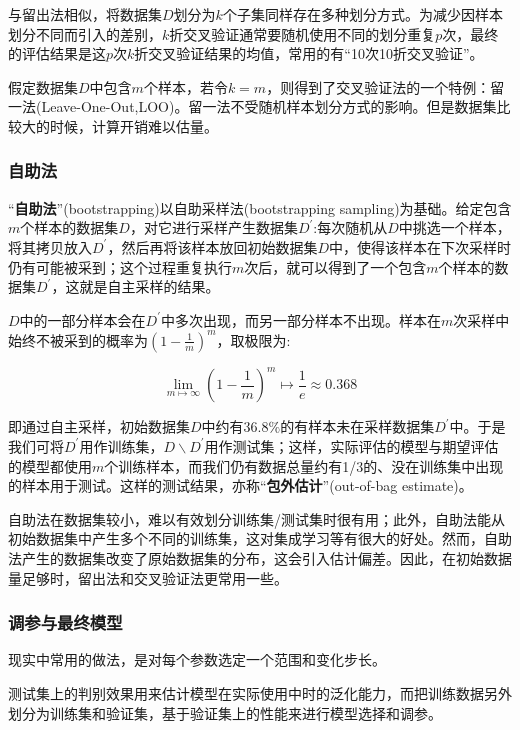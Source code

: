\documentclass[cn,hazy,black,normal]{elegantnote}
\numberwithin{equation}{section}
\numberwithin{figure}{section}
\begin{document}
				与留出法相似，将数据集$D$划分为$k$个子集同样存在多种划分方式。为减少因样本划分不同而引入的差别，$k$折交叉验证通常要随机使用不同的划分重复$p$次，最终的评估结果是这$p$次$k$折交叉验证结果的均值，常用的有“10次10折交叉验证”。
	
				假定数据集$D$中包含$m$个样本，若令$k=m$，则得到了交叉验证法的一个特例：留一法(Leave-One-Out,LOO)。留一法不受随机样本划分方式的影响。但是数据集比较大的时候，计算开销难以估量。
				
			\subsubsection{自助法}
				“\textbf{自助法}”(bootstrapping)以自助采样法(bootstrapping sampling)为基础。给定包含$m$个样本的数据集$D$，对它进行采样产生数据集$D^{\prime}$:每次随机从$D$中挑选一个样本，将其拷贝放入$D^{\prime}$，然后再将该样本放回初始数据集$D$中，使得该样本在下次采样时仍有可能被采到；这个过程重复执行$m$次后，就可以得到了一个包含$m$个样本的数据集$D^{\prime}$，这就是自主采样的结果。
				
				
				$D$中的一部分样本会在$D^{\prime}$中多次出现，而另一部分样本不出现。样本在$m$次采样中始终不被采到的概率为$(1-\frac{1}{m})^m$，取极限为:
				
				\begin{equation}
					\lim\limits_{m\mapsto\infty}(1-\frac{1}{m})^m \mapsto \frac{1}{e} \approx 0.368
				\end{equation}
	
				即通过自主采样，初始数据集$D$中约有$36.8\%$的有样本未在采样数据集$D^{\prime}$中。于是我们可将$D^{\prime}$用作训练集，$D\backslash D^{\prime}$用作测试集；这样，实际评估的模型与期望评估的模型都使用$m$个训练样本，而我们仍有数据总量约有1/3的、没在训练集中出现的样本用于测试。这样的测试结果，亦称“\textbf{包外估计}”(out-of-bag estimate)。
				
				自助法在数据集较小，难以有效划分训练集/测试集时很有用；此外，自助法能从初始数据集中产生多个不同的训练集，这对集成学习等有很大的好处。然而，自助法产生的数据集改变了原始数据集的分布，这会引入估计偏差。因此，在初始数据量足够时，留出法和交叉验证法更常用一些。
	
			\subsubsection{调参与最终模型}
				现实中常用的做法，是对每个参数选定一个范围和变化步长。
				
				测试集上的判别效果用来估计模型在实际使用中时的泛化能力，而把训练数据另外划分为训练集和验证集，基于验证集上的性能来进行模型选择和调参。		
		
\end{document}
